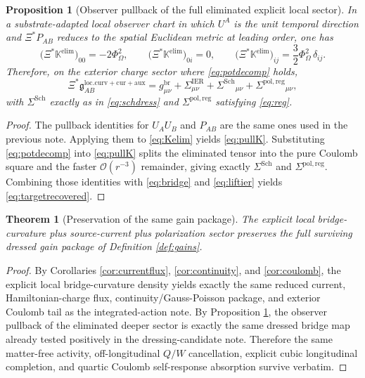 \documentclass[11pt]{article}
\newcommand{\BridgeMetric}{\mathfrak g}
\newcommand{\ObserverMap}{\Xi}
\newcommand{\ProjSub}{P}
\newcommand{\FlowPot}{\Phi_\Omega}
\newcommand{\SigmaIER}{\Sigma^{\mathrm{IER}}}
\newcommand{\SigmaDressSch}{\Sigma^{\mathrm{Sch}}}
\newcommand{\SigmaRegPol}{\Sigma^{\mathrm{pol,reg}}}
\newcommand{\AuxPol}{\mathbb K}
\newtheorem{proposition}{Proposition}
\newtheorem{theorem}{Theorem}
\begin{document}
\begin{proposition}[Observer pullback of the full eliminated explicit local sector]
\label{prop:pullback}
In a substrate-adapted local observer chart in which \(U^A\) is the unit temporal direction and \(\ObserverMap^\ast\ProjSub_{AB}\) reduces to the spatial Euclidean metric at leading order, one has
\begin{equation}
\bigl(\ObserverMap^\ast\AuxPol^{\mathrm{elim}}\bigr)_{00}
=
-2\FlowPot^2,
\qquad
\bigl(\ObserverMap^\ast\AuxPol^{\mathrm{elim}}\bigr)_{0i}
=
0,
\qquad
\bigl(\ObserverMap^\ast\AuxPol^{\mathrm{elim}}\bigr)_{ij}
=
\frac32\FlowPot^2\,\delta_{ij}.
\label{eq:pullK}
\end{equation}
Therefore, on the exterior charge sector where \eqref{eq:potdecomp} holds,
\begin{equation}
\ObserverMap^\ast \BridgeMetric_{AB}^{\mathrm{loc.curv+cur+aux}}
=
g_{\mu\nu}^{\mathrm{br}}
+\SigmaIER_{\mu\nu}
+\SigmaDressSch{}_{\mu\nu}
+\SigmaRegPol{}_{\mu\nu},
\label{eq:targetrecovered}
\end{equation}
with \(\SigmaDressSch\) exactly as in \eqref{eq:schdress} and \(\SigmaRegPol\) satisfying \eqref{eq:reg}.
\end{proposition}

\begin{proof}
The pullback identities for \(U_AU_B\) and \(\ProjSub_{AB}\) are the same ones used in the previous note. Applying them to \eqref{eq:Kelim} yields \eqref{eq:pullK}. Substituting \eqref{eq:potdecomp} into \eqref{eq:pullK} splits the eliminated tensor into the pure Coulomb square and the faster \(\mathcal O(r^{-3})\) remainder, giving exactly \(\SigmaDressSch\) and \(\SigmaRegPol\). Combining those identities with \eqref{eq:bridge} and \eqref{eq:liftier} yields \eqref{eq:targetrecovered}.
\end{proof}

\begin{theorem}[Preservation of the same gain package]
\label{thm:gains}
The explicit local bridge-curvature plus source-current plus polarization sector preserves the full surviving dressed gain package of Definition \ref{def:gains}.
\end{theorem}

\begin{proof}
By Corollaries \ref{cor:currentflux}, \ref{cor:continuity}, and \ref{cor:coulomb}, the explicit local bridge-curvature density yields exactly the same reduced current, Hamiltonian-charge flux, continuity/Gauss-Poisson package, and exterior Coulomb tail as the integrated-action note. By Proposition \ref{prop:pullback}, the observer pullback of the eliminated deeper sector is exactly the same dressed bridge map already tested positively in the dressing-candidate note. Therefore the same matter-free activity, off-longitudinal \(Q/W\) cancellation, explicit cubic longitudinal completion, and quartic Coulomb self-response absorption survive verbatim.
\end{proof}
\end{document}
